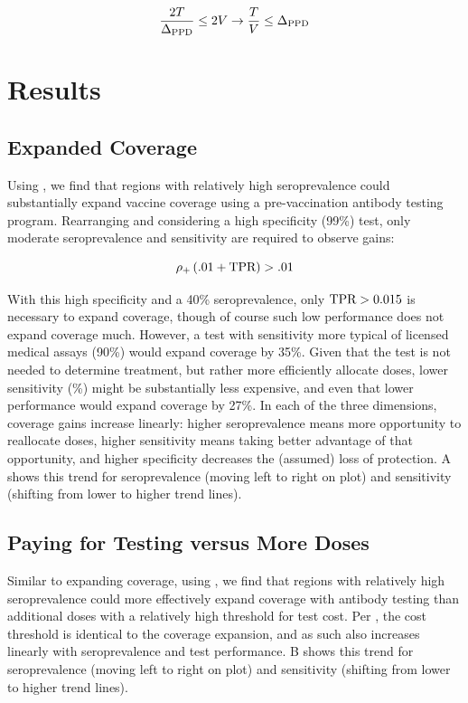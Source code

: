\documentclass[10pt,a4paper,twocolumn]{article}
\begin{document}
\begin{equation}\label{costlim}
\frac{2T}{\Delta_{\textrm{PPD}}} \le 2V \rightarrow \frac{T}{V} \le \Delta_{\textrm{PPD}}
\end{equation}

\section*{Results}

\subsection*{Expanded Coverage}

Using , we find that regions with relatively high seroprevalence could substantially expand vaccine coverage using a pre-vaccination antibody testing program. Rearranging  and considering a high specificity (99\%) test, only moderate seroprevalence and sensitivity are required to observe gains: 

\begin{equation}\label{egppd}
\rho_{{+}} \left(.01 + \textrm{TPR}\right) > .01
\end{equation}

With this high specificity and a 40\% seroprevalence, only $\textrm{TPR} > 0.015$ is necessary to expand coverage, though of course such low performance does not expand coverage much. However, a test with sensitivity more typical of licensed medical assays (90\%) would expand coverage by 35\%. Given that the test is not needed to determine treatment, but rather more efficiently allocate doses, lower sensitivity (\%) might be substantially less expensive, and even that lower performance would expand coverage by 27\%. In each of the three dimensions, coverage gains increase linearly: higher seroprevalence means more opportunity to reallocate doses, higher sensitivity means taking better advantage of that opportunity, and higher specificity decreases the (assumed) loss of protection. A shows this trend for seroprevalence (moving left to right on plot) and sensitivity (shifting from lower to higher trend lines).  

\subsection*{Paying for Testing versus More Doses}

Similar to expanding coverage, using , we find that regions with relatively high seroprevalence could more effectively expand coverage with antibody testing than additional doses with a relatively high threshold for test cost. Per , the cost threshold is identical to the coverage expansion, and as such also increases linearly with seroprevalence and test performance. B shows this trend for seroprevalence (moving left to right on plot) and sensitivity (shifting from lower to higher trend lines).
\end{document}
